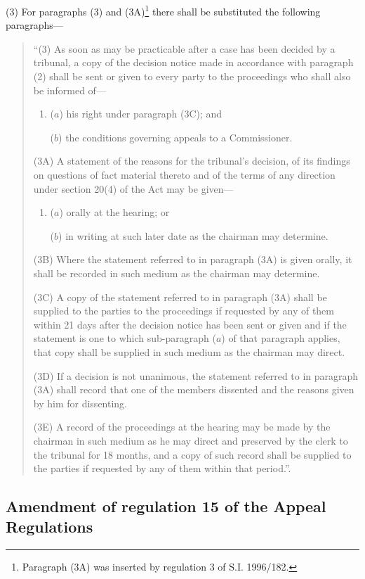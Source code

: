 \documentclass[a4paper]{article}
\begin{document}
(3) For paragraphs (3) and (3A)\footnote{\frenchspacing Paragraph (3A) was inserted by regulation 3 of S.I. 1996/182.} there shall be substituted the following paragraphs—
\begin{quotation}
“(3) As soon as may be practicable after a case has been decided by a tribunal, a copy of the decision notice made in accordance with paragraph (2) shall be sent or given to every party to the proceedings who shall also be informed of—
\begin{enumerate}\item[]
($a$) his right under paragraph (3C); and

($b$) the conditions governing appeals to a Commissioner.
\end{enumerate}

(3A) A statement of the reasons for the tribunal’s decision, of its findings on questions of fact material thereto and of the terms of any direction under section 20(4) of the Act may be given—
\begin{enumerate}\item[]
($a$) orally at the hearing; or

($b$) in writing at such later date as the chairman may determine.
\end{enumerate}

(3B) Where the statement referred to in paragraph (3A) is given orally, it shall be recorded in such medium as the chairman may determine.

(3C) A copy of the statement referred to in paragraph (3A) shall be supplied to the parties to the proceedings if requested by any of them within 21 days after the decision notice has been sent or given and if the statement is one to which sub-paragraph ($a$) of that paragraph applies, that copy shall be supplied in such medium as the chairman may direct.

(3D) If a decision is not unanimous, the statement referred to in paragraph (3A) shall record that one of the members dissented and the reasons given by him for dissenting.

(3E) A record of the proceedings at the hearing may be made by the chairman in such medium as he may direct and preserved by the clerk to the tribunal for 18 months, and a copy of such record shall be supplied to the parties if requested by any of them within that period.”.
\end{quotation}

\subsection[21. Amendment of regulation 15 of the Appeal Regulations]{Amendment of regulation 15 of the Appeal Regulations}
\end{document}
